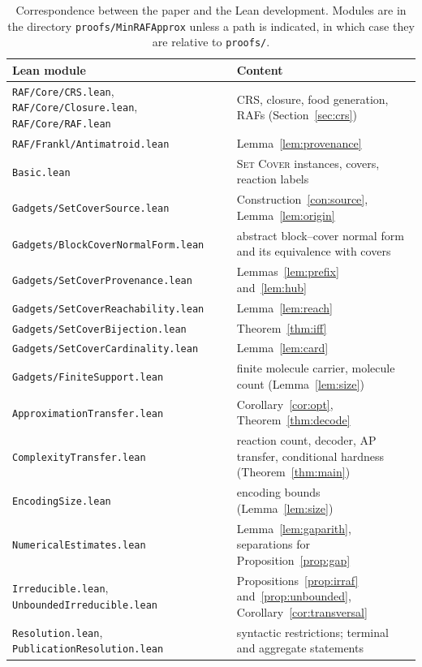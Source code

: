 \documentclass[11pt,a4paper]{article}
\theoremstyle{plain}
\theoremstyle{definition}
\theoremstyle{remark}
\newcommand{\lean}[1]{\texttt{#1}}
\newcommand{\SetCover}{\textup{\textsc{Set Cover}}}
\begin{document}
\begin{table}[ht]
\centering\footnotesize
\begin{tabular}{@{}>{\raggedright\arraybackslash}p{}>{\raggedright\arraybackslash}p{}@{}}
\toprule
Lean module & Content \\
\midrule
\lean{RAF/Core/CRS.lean}, \lean{RAF/Core/Closure.lean}, \lean{RAF/Core/RAF.lean} & CRS, closure, food generation, RAFs (Section~\ref{sec:crs}) \\
\lean{RAF/Frankl/Antimatroid.lean} & Lemma~\ref{lem:provenance} \\
\lean{Basic.lean} & \SetCover{} instances, covers, reaction labels \\
\lean{Gadgets/SetCoverSource.lean} & Construction~\ref{con:source}, Lemma~\ref{lem:origin} \\
\lean{Gadgets/BlockCoverNormalForm.lean} & abstract block--cover normal form and its equivalence with covers \\
\lean{Gadgets/SetCoverProvenance.lean} & Lemmas~\ref{lem:prefix} and~\ref{lem:hub} \\
\lean{Gadgets/SetCoverReachability.lean} & Lemma~\ref{lem:reach} \\
\lean{Gadgets/SetCoverBijection.lean} & Theorem~\ref{thm:iff} \\
\lean{Gadgets/SetCoverCardinality.lean} & Lemma~\ref{lem:card} \\
\lean{Gadgets/FiniteSupport.lean} & finite molecule carrier, molecule count (Lemma~\ref{lem:size}) \\
\lean{ApproximationTransfer.lean} & Corollary~\ref{cor:opt}, Theorem~\ref{thm:decode} \\
\lean{ComplexityTransfer.lean} & reaction count, decoder, AP transfer, conditional hardness (Theorem~\ref{thm:main}) \\
\lean{EncodingSize.lean} & encoding bounds (Lemma~\ref{lem:size}) \\
\lean{NumericalEstimates.lean} & Lemma~\ref{lem:gaparith}, separations for Proposition~\ref{prop:gap} \\
\lean{Irreducible.lean}, \lean{UnboundedIrreducible.lean} & Propositions~\ref{prop:irraf} and~\ref{prop:unbounded}, Corollary~\ref{cor:transversal} \\
\lean{Resolution.lean}, \lean{PublicationResolution.lean} & syntactic restrictions; terminal and aggregate statements \\
\bottomrule
\end{tabular}
\caption{Correspondence between the paper and the Lean development. Modules are in the directory \lean{proofs/MinRAFApprox} unless a path is indicated, in which case they are relative to \lean{proofs/}.}
\label{tab:modules}
\end{table}
\end{document}
